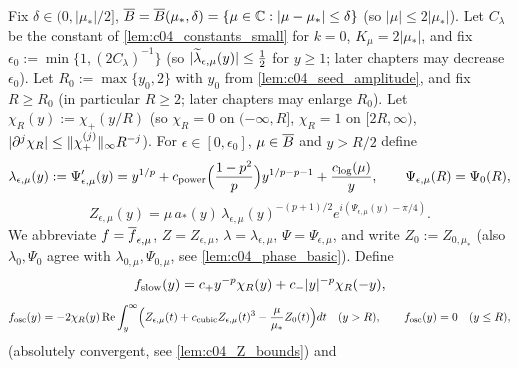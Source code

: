 \begin{definition}
  \label{def:approximate_solution_family}
  Fix $\delta\in(0,|\mu_*|/2]$, $\overline{B}=\overline{B}(\mu_*,\delta)=\{\mu\in\mathbb{C}:|\mu-\mu_*|\le\delta\}$ (so $|\mu|\le2|\mu_*|$). Let $C_\lambda$ be the
  constant of \cref{lem:c04_constants_small} for $k=0$, $K_\mu=2|\mu_*|$, and fix $\epsilon_0:=\min\{1,(2C_\lambda)^{-1}\}$ (so
  $|\widetilde{\lambda}_{\epsilon,\mu}(y)|\le\frac12$ for $y\ge1$; later chapters may decrease $\epsilon_0$). Let $R_0:=\max\{y_0,2\}$ with $y_0$ from
  \cref{lem:c04_seed_amplitude}, and fix $R\ge R_0$ (in particular $R\ge2$; later chapters may enlarge $R_0$). Let
  $\chi_R(y):=\chi_+(y/R)$ (so $\chi_R=0$ on $(-\infty,R]$, $\chi_R=1$ on $[2R,\infty)$, $|\partial^j\chi_R|\le\|\chi_+^{(j)}\|_\infty R^{-j}$).
  For $\epsilon\in[0,\epsilon_0]$, $\mu\in\overline{B}$ and $y>R/2$ define
  \begin{equation}\label{eqn:approx_modified_frequency}
    \lambda_{\epsilon,\mu}(y):=\Psi_{\epsilon,\mu}'(y)=y^{1/p}+c_{\textup{power}}\Bigl(\frac{1-p^2}p\Bigr)y^{1/p-p-1}+\frac{c_{\textup{log}}(\mu)}y,\qquad\Psi_{\epsilon,\mu}(R)=\Psi_0(R),
  \end{equation}
  \begin{equation}\label{eqn:approx_Z_definition}
    Z_{\epsilon,\mu}(y)=\mu\,a_*(y)\,\lambda_{\epsilon,\mu}(y)^{-(p+1)/2}e^{i(\Psi_{\epsilon,\mu}(y)-\pi/4)} .
  \end{equation}
  We abbreviate $f=\overline{f}_{\epsilon,\mu}$, $Z=Z_{\epsilon,\mu}$, $\lambda=\lambda_{\epsilon,\mu}$, $\Psi=\Psi_{\epsilon,\mu}$, and write
  $Z_0:=Z_{0,\mu_*}$ (also $\lambda_0,\Psi_0$ agree with $\lambda_{0,\mu},\Psi_{0,\mu}$, see \cref{lem:c04_phase_basic}). Define
  \begin{equation}\label{eqn:approx_slow_correction}
    f_{\textup{slow}}(y)=c_+y^{-p}\chi_R(y)+c_-|y|^{-p}\chi_R(-y),
  \end{equation}
  \begin{equation}\label{eqn:approx_oscillatory_correction}
    f_{\textup{osc}}(y)=-2\chi_R(y)\operatorname{Re}\int_y^\infty\Bigl(Z_{\epsilon,\mu}(t)+c_{\textup{cubic}}Z_{\epsilon,\mu}(t)^3-\frac\mu{\mu_*}Z_0(t)\Bigr)dt
    \quad(y>R),\qquad f_{\textup{osc}}(y)=0\quad(y\le R),
  \end{equation}
  (absolutely convergent, see \cref{lem:c04_Z_bounds}) and

\end{definition}
